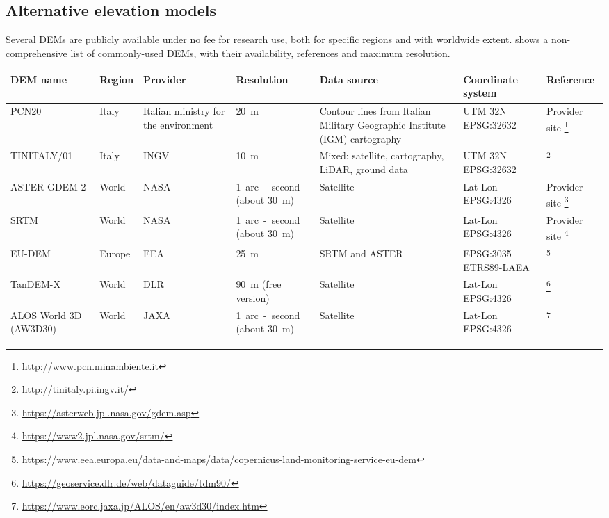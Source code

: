 \subsection{Alternative elevation models}
Several DEMs are publicly available under no fee for research use, both for specific regions and with worldwide extent.  shows a non-comprehensive list of commonly-used DEMs, with their availability, references and maximum resolution.
\begin{table}
\centering
\begin{tabular}{@{}m{2.5cm}lm{2.2cm}m{2.4cm}m{5cm}m{2.1cm}m{5cm}@{}}
\toprule
DEM name & Region & Provider & Resolution & Data source & Coordinate system & Reference \\ \midrule

PCN20 & Italy & Italian ministry for the environment & \SI{20}{\metre} & Contour lines from Italian Military Geographic Institute (IGM) cartography & UTM 32N EPSG:32632 & Provider site \footnote{\url{http://www.pcn.minambiente.it}} \\

TINITALY/01 & Italy & INGV & \SI{10}{\metre} & Mixed: satellite, cartography, LiDAR, ground data & UTM 32N EPSG:32632 & \citet{Tarquini2007, Tarquini2012} \footnote{\url{http://tinitaly.pi.ingv.it/}} \\

ASTER GDEM-2 & World & NASA & \SI{1}{arc-second} (about \SI{30}{\metre}) & Satellite & Lat-Lon EPSG:4326 & Provider site \footnote{\url{https://asterweb.jpl.nasa.gov/gdem.asp}} \\

SRTM & World  & NASA & \SI{1}{arc-second} (about \SI{30}{\metre}) & Satellite & Lat-Lon EPSG:4326 & Provider site \footnote{\url{https://www2.jpl.nasa.gov/srtm/}} \\

EU-DEM & Europe & EEA & \SI{25}{\metre} & SRTM and ASTER & EPSG:3035 ETRS89-LAEA & \citet{Bashfield2011,Jozsa2014} \footnote{\url{https://www.eea.europa.eu/data-and-maps/data/copernicus-land-monitoring-service-eu-dem}} \\

TanDEM-X & World & DLR & \SI{90}{\metre} (free version) & Satellite & Lat-Lon EPSG:4326 & \citet{Rizzoli2017}\footnote{\url{https://geoservice.dlr.de/web/dataguide/tdm90/}} \\

ALOS World 3D (AW3D30) & World & JAXA & \SI{1}{arc-second} (about \SI{30}{\metre}) & Satellite & Lat-Lon EPSG:4326 & \citet{Tadono2016, Tadono2017} \footnote{\url{https://www.eorc.jaxa.jp/ALOS/en/aw3d30/index.htm}} \\


\end{tabular}
\end{table}
